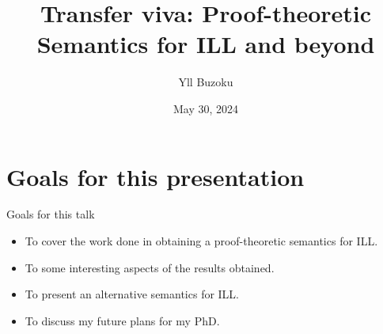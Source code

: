 \documentclass{beamer}
\title[P-tS for ILL]{Transfer viva: \newline Proof-theoretic Semantics for ILL and beyond}
\author{Yll Buzoku}
\institute[UCL]{%
  Department of Computer Science \\ %
  University College London
}
\date{May 30, 2024}
\begin{document}
\begin{frame}
\titlepage
\end{frame}
\section*{Goals for this presentation}
\begin{frame}{Goals for this talk}
\begin{itemize}
\item To cover the work done in obtaining a proof-theoretic semantics for ILL.
\item To some interesting aspects of the results obtained.
\item To present an alternative semantics for ILL.
\item To discuss my future plans for my PhD.
\end{itemize}
\end{frame}
\end{document}
